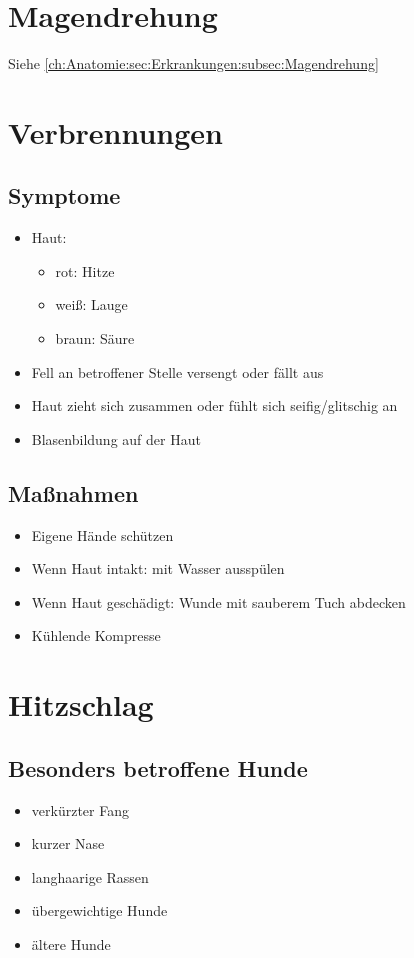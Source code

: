 \section{Magendrehung}
    Siehe \ref{ch:Anatomie:sec:Erkrankungen:subsec:Magendrehung}


\section{Verbrennungen}
    \subsection{Symptome}
        \begin{itemize}
            \item Haut:
            \begin{itemize}
                \item rot: Hitze
                \item weiß: Lauge
                \item braun: Säure
            \end{itemize}
            \item Fell an betroffener Stelle versengt oder fällt aus
            \item Haut zieht sich zusammen oder fühlt sich seifig/glitschig an
            \item Blasenbildung auf der Haut
        \end{itemize}

    \subsection{Maßnahmen}
        \begin{itemize}
            \item Eigene Hände schützen
            \item Wenn Haut intakt: mit Wasser ausspülen
            \item Wenn Haut geschädigt: Wunde mit sauberem Tuch abdecken
            \item Kühlende Kompresse
        \end{itemize}

\section{Hitzschlag}
    \subsection {Besonders betroffene Hunde}
        \begin{itemize}
            \item verkürzter Fang
            \item kurzer Nase
            \item langhaarige Rassen
            \item übergewichtige Hunde
            \item ältere Hunde
        \end{itemize}
